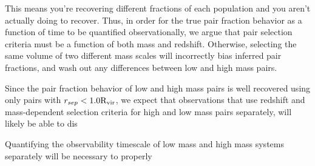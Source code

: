 \documentclass[twocolumn]{aastex631}
\newcommand{\Rvir}{\ensuremath{\rm R_{vir}}}
\begin{document}
    This means you're recovering different fractions of each population and you aren't actually doing to recover. 
Thus, in order for the true pair fraction behavior as a function of time to be quantified observationally, we argue that pair selection criteria must be a function of both mass and redshift. 
Otherwise, selecting the same volume of two different mass scales will incorrectly bias inferred pair fractions, and wash out any differences between low and high mass pairs. %



Since the pair fraction behavior of low and high mass pairs is well recovered using only pairs with $r_{sep}<1.0\Rvir$, we expect that observations that use redshift and mass-dependent selection criteria for high and low mass pairs separately, will likely be able to dis



Quantifying the observability timescale of low mass and high mass systems separately will be necessary to properly 




{}

\end{document}
